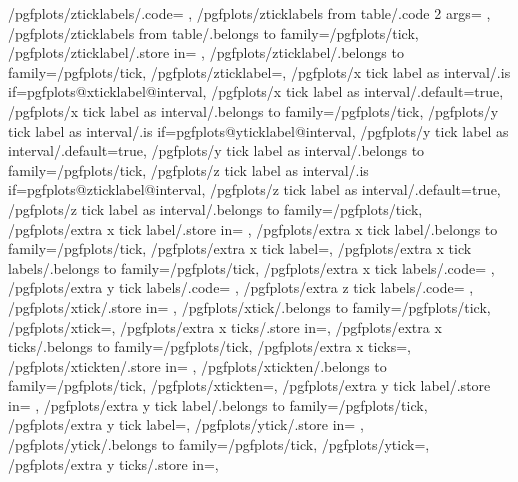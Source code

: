{	/pgfplots/zticklabels/.code={%
		\pgfplotslistnew{}%
		\let\pgfplots@zticklabel=\pgfplots@user@ticklabel@list@z
	},
	/pgfplots/zticklabels from table/.code 2 args={%
		\to\pgfplots@zticklabels
		\let\pgfplots@zticklabel=\pgfplots@user@ticklabel@list@z
	},
	/pgfplots/zticklabels from table/.belongs to family=/pgfplots/tick,
	/pgfplots/zticklabel/.store in=	\pgfplots@zticklabel,
	/pgfplots/zticklabel/.belongs to family=/pgfplots/tick,
	/pgfplots/zticklabel=,
	/pgfplots/x tick label as interval/.is if=pgfplots@xticklabel@interval,
	/pgfplots/x tick label as interval/.default=true,
	/pgfplots/x tick label as interval/.belongs to family=/pgfplots/tick,
	/pgfplots/y tick label as interval/.is if=pgfplots@yticklabel@interval,
	/pgfplots/y tick label as interval/.default=true,
	/pgfplots/y tick label as interval/.belongs to family=/pgfplots/tick,
	/pgfplots/z tick label as interval/.is if=pgfplots@zticklabel@interval,
	/pgfplots/z tick label as interval/.default=true,
	/pgfplots/z tick label as interval/.belongs to family=/pgfplots/tick,
	/pgfplots/extra x tick label/.store in=	\pgfplots@extra@xticklabel,
	/pgfplots/extra x tick label/.belongs to family=/pgfplots/tick,
	/pgfplots/extra x tick label=,
	/pgfplots/extra x tick labels/.belongs to family=/pgfplots/tick,
	/pgfplots/extra x tick labels/.code={%
		\pgfplotslistnew{}%
		\let\pgfplots@extra@xticklabel=\pgfplots@user@extra@ticklabel@list@x
	},
	/pgfplots/extra y tick labels/.code={%
		\pgfplotslistnew{}%
		\let\pgfplots@extra@yticklabel=\pgfplots@user@extra@ticklabel@list@y
	},
	/pgfplots/extra z tick labels/.code={%
		\pgfplotslistnew{}%
		\let\pgfplots@extra@zticklabel=\pgfplots@user@extra@ticklabel@list@z
	},
	/pgfplots/xtick/.store in=			\pgfplots@xtick,
	/pgfplots/xtick/.belongs to family=/pgfplots/tick,
	/pgfplots/xtick=,
	/pgfplots/extra x ticks/.store in=\pgfplots@extra@xtick,
	/pgfplots/extra x ticks/.belongs to family=/pgfplots/tick,
	/pgfplots/extra x ticks=,
	/pgfplots/xtickten/.store in=		\pgfplots@xtickten,
	/pgfplots/xtickten/.belongs to family=/pgfplots/tick,
	/pgfplots/xtickten=,
	/pgfplots/extra y tick label/.store in=	\pgfplots@extra@yticklabel,
	/pgfplots/extra y tick label/.belongs to family=/pgfplots/tick,
	/pgfplots/extra y tick label=,
	/pgfplots/ytick/.store in=			\pgfplots@ytick,
	/pgfplots/ytick/.belongs to family=/pgfplots/tick,
	/pgfplots/ytick=,
	/pgfplots/extra y ticks/.store in=\pgfplots@extra@ytick,
}
